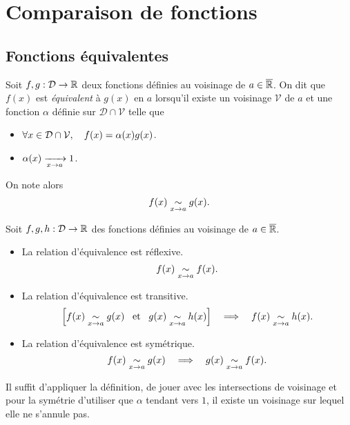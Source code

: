 \documentclass{magnolia}
\begin{document}
\section{Comparaison de fonctions}
\subsection{Fonctions équivalentes}



\begin{definition}[utile=-3]
Soit $f,g:\mathcal{D}\to\mathbb{R}$ deux fonctions définies au voisinage de $a\in\overline{\mathbb{R}}$. On dit
que $f(x)$ est \emph{équivalent} à $g(x)$ en $a$ lorsqu'il existe un voisinage $\mathcal{V}$ de $a$ et une fonction $\alpha$ définie sur $\mathcal{D}\cap\mathcal{V}$ telle que
\begin{itemize}
\item $\forall x\in\mathcal{D}\cap\mathcal{V},\quad f(x)=\alpha(x)g(x)$.
\item $\alpha(x)\xrightarrow[x\rightarrow a]{}1$.
\end{itemize}
On note alors
\[f(x)\underset{x\rightarrow a}{\sim} g(x).\]
\end{definition}

\begin{proposition}[utile=-3]
Soit $f,g,h:\mathcal{D}\to\mathbb{R}$ des fonctions définies au voisinage de $a\in\overline{\mathbb{R}}$.
\begin{itemize}
\item La relation d'équivalence est réflexive.
  \[f(x)\underset{x\rightarrow a}{\sim} f(x).\]
\item La relation d'équivalence est transitive.
  \[\left[f(x)\underset{x\rightarrow a}{\sim}g(x) \quad\!\text{et}\quad\! g(x)\underset{x\rightarrow a}{\sim}h(x)\right]\quad\Longrightarrow\quad
    f(x)\underset{x\rightarrow a}{\sim}h(x).\]
\item La relation d'équivalence est symétrique.
  \[f(x)\underset{x\rightarrow a}{\sim}g(x) \quad\Longrightarrow\quad g(x)\underset{x\rightarrow a}{\sim}f(x).\]
\end{itemize}
\end{proposition}

\begin{preuve}
Il suffit d'appliquer la définition, de jouer avec les intersections de voisinage et pour la symétrie d'utiliser que $\alpha$ tendant vers $1$, il existe un voisinage sur lequel elle ne s'annule pas.
\end{preuve}
\end{document}
